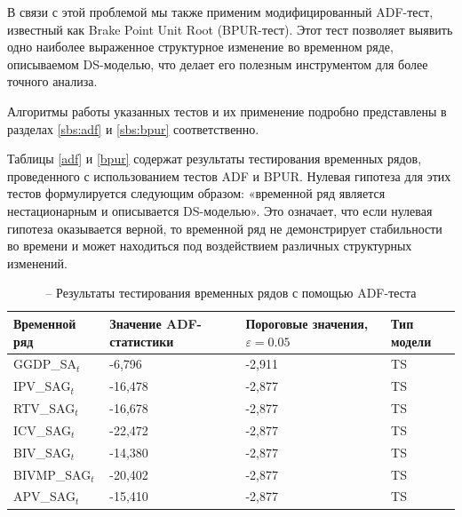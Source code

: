 \documentclass[a4paper, 14pt]{extreport}
\numberwithin{equation}{subsection}
\numberwithin{equation}{section}
\begin{document}
	В связи с этой проблемой мы также применим модифицированный ADF-тест, известный как Brake Point Unit Root (BPUR-тест). Этот тест позволяет выявить одно наиболее выраженное структурное изменение во временном ряде, описываемом DS-моделью, что делает его полезным инструментом для более точного анализа.
	
	Алгоритмы работы указанных тестов и их применение подробно представлены в разделах \ref{sbs:adf} и \ref{sbs:bpur} соответственно.
	
	Таблицы \ref{adf} и \ref{bpur} содержат результаты тестирования временных рядов, проведенного с использованием тестов ADF и BPUR. Нулевая гипотеза для этих тестов формулируется следующим образом: «временной ряд является нестационарным и описывается DS-моделью». Это означает, что если нулевая гипотеза оказывается верной, то временной ряд не демонстрирует стабильности во времени и может находиться под воздействием различных структурных изменений.
	
	
	\begin{table}[h!]
		\centering
		\caption{\label{adf} -- Результаты тестирования временных рядов с помощью ADF-теста}
		\label{table:ADF-test}
		\begin{tabular}{|p{3cm}|p{3cm}|p{2.5cm}|p{2cm}|}
			\hline
			{Временной ряд} & {Значение ADF-статистики} & {Пороговые значения, $\varepsilon = 0.05$} & {Тип модели} \\ \hline
			GGDP\_SA$_t$ & -6,796  & -2,911  & TS \\ \hline
			IPV\_SAG$_t$ & -16,478 & -2,877  & TS \\ \hline
			RTV\_SAG$_t$ & -16,678 & -2,877  & TS \\ \hline
			ICV\_SAG$_t$ & -22,472 & -2,877  & TS \\ \hline
			BIV\_SAG$_t$ & -14,380 & -2,877  & TS \\ \hline
			BIVMP\_SAG$_t$ & -20,402 & -2,877 & TS \\ \hline
			APV\_SAG$_t$ & -15,410 & -2,877  & TS \\ \hline
		\end{tabular}
	\end{table}
	
\end{document}
